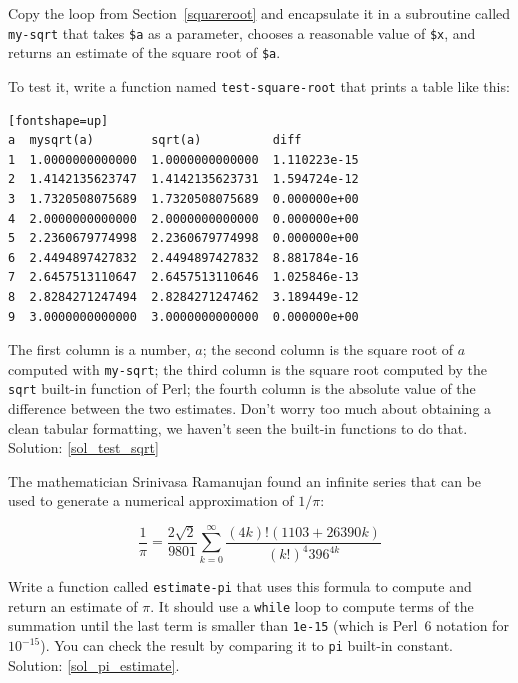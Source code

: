 \begin{exercise}
\label{test_sqrt}

Copy the loop from Section~\ref{squareroot}
and encapsulate it in a subroutine called
\verb"my-sqrt" that takes {\tt \$a} as a parameter, chooses a
reasonable value of {\tt \$x}, and returns an estimate of 
the square root of {\tt \$a}.

To test it, write a function named \verb"test-square-root"
that prints a table like this:

\begin{verbatim}[fontshape=up]
a  mysqrt(a)        sqrt(a)          diff
1  1.0000000000000  1.0000000000000  1.110223e-15
2  1.4142135623747  1.4142135623731  1.594724e-12
3  1.7320508075689  1.7320508075689  0.000000e+00
4  2.0000000000000  2.0000000000000  0.000000e+00
5  2.2360679774998  2.2360679774998  0.000000e+00
6  2.4494897427832  2.4494897427832  8.881784e-16
7  2.6457513110647  2.6457513110646  1.025846e-13
8  2.8284271247494  2.8284271247462  3.189449e-12
9  3.0000000000000  3.0000000000000  0.000000e+00

\end{verbatim}
%
The first column is a number, $a$; the second column is the 
square root of $a$ computed with \verb"my-sqrt"; the third 
column is the square root computed by the {\tt sqrt} built-in 
function of Perl; the fourth column is the absolute value of 
the difference between the two estimates. Don't worry too much about 
obtaining a clean tabular formatting, we haven't 
seen the built-in functions to do that. Solution: \ref{sol_test_sqrt}
%

\end{exercise}



\begin{exercise}
\label{pi_estimate}

The mathematician Srinivasa Ramanujan found an
infinite series
that can be used to generate a numerical
approximation of $1 / \pi$:

\[ \frac{1}{\pi} = \frac{2\sqrt{2}}{9801} 
\sum^\infty_{k=0} \frac{(4k)!(1103+26390k)}{(k!)^4 396^{4k}} \]

Write a function called \verb"estimate-pi" that uses this 
formula to compute and return an estimate of $\pi$.  It 
should use a {\tt while} loop to compute terms of the 
summation until the last term is smaller than {\tt 1e-15} 
(which is Perl~6 notation for $10^{-15}$). You can check
the result by comparing it to {\tt pi} built-in constant.
Solution: \ref{sol_pi_estimate}.

\end{exercise}

